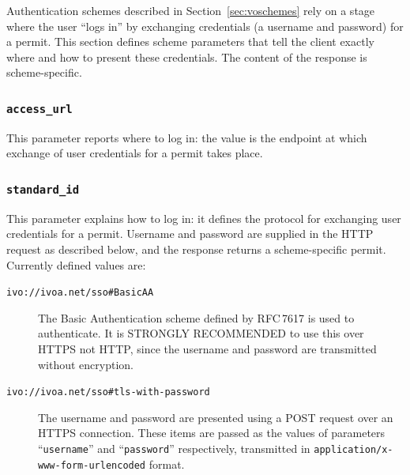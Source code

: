 \documentclass[11pt,a4paper]{ivoa}
\newcommand{\rfc}[1]{RFC\,#1}
\begin{document}
Authentication schemes described in Section~\ref{sec:voschemes}
rely on a stage where the user ``logs in'' by exchanging
credentials (a username and password) for a permit.
This section defines scheme parameters that
tell the client exactly where and how to present these credentials.
The content of the response is scheme-specific.

\subsubsection{\mbox{\tt access\_url}}
\label{sec:access-url}

This parameter reports where to log in:
the value is the endpoint at which
exchange of user credentials for a permit
takes place.

\subsubsection{\mbox{\tt standard\_id}}
\label{sec:standard-id}

This parameter explains how to log in:
it defines the protocol for exchanging user credentials
for a permit.
Username and password are supplied in the HTTP request as described below,
and the response returns a scheme-specific permit.
Currently defined values are:

\begin{description}
  \item[{\tt ivo://ivoa.net/sso\#BasicAA}]
        The Basic Authentication scheme defined by \rfc{7617} is used to
        authenticate.
        It is STRONGLY RECOMMENDED to use this over HTTPS not HTTP,
        since the username and password are transmitted without encryption.
  \item[{\tt ivo://ivoa.net/sso\#tls-with-password}]
        The username and password are presented using a POST request
        over an HTTPS connection.
        These items are passed as the values of parameters
        ``{\tt username}'' and ``{\tt password}'' respectively,
        transmitted in {\tt application/x-www-form-urlencoded} format.
\end{description}

\end{document}
